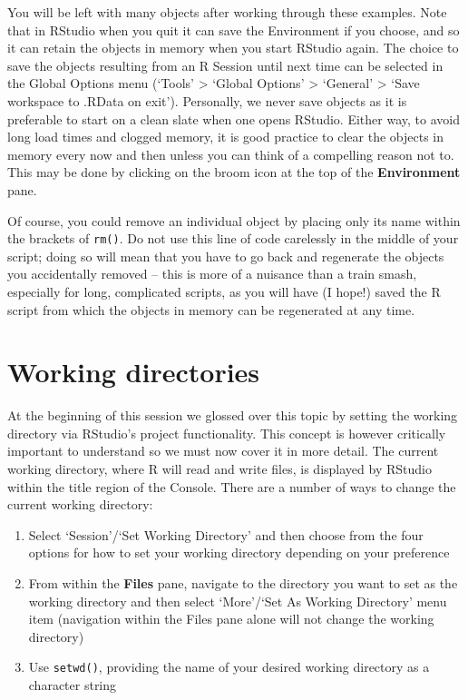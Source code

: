 \documentclass[
]{book}
\begin{document}
You will be left with many objects after working through these examples. Note that in RStudio when you quit it can save the Environment if you choose, and so it can retain the objects in memory when you start RStudio again. The choice to save the objects resulting from an R Session until next time can be selected in the Global Options menu (`Tools' \textgreater{} `Global Options' \textgreater{} `General' \textgreater{} `Save workspace to .RData on exit'). Personally, we never save objects as it is preferable to start on a clean slate when one opens RStudio. Either way, to avoid long load times and clogged memory, it is good practice to clear the objects in memory every now and then unless you can think of a compelling reason not to. This may be done by clicking on the broom icon at the top of the \textbf{Environment} pane.

Of course, you could remove an individual object by placing only its name within the brackets of \texttt{rm()}. Do not use this line of code carelessly in the middle of your script; doing so will mean that you have to go back and regenerate the objects you accidentally removed -- this is more of a nuisance than a train smash, especially for long, complicated scripts, as you will have (I hope!) saved the R script from which the objects in memory can be regenerated at any time.

\hypertarget{working-directories}{%
\section{Working directories}\label{working-directories}}

At the beginning of this session we glossed over this topic by setting the working directory via RStudio's project functionality. This concept is however critically important to understand so we must now cover it in more detail. The current working directory, where R will read and write files, is displayed by RStudio within the title region of the Console. There are a number of ways to change the current working directory:

\begin{enumerate}
\def\labelenumi{\arabic{enumi}.}
\item
  Select `Session'/`Set Working Directory' and then choose from the four options for how to set your working directory depending on your preference
\item
  From within the \textbf{Files} pane, navigate to the directory you want to set as the working directory and then select `More'/`Set As Working Directory' menu item (navigation within the Files pane alone will not change the working directory)
\item
  Use \texttt{setwd()}, providing the name of your desired working directory as a character string
\end{enumerate}
\end{document}
